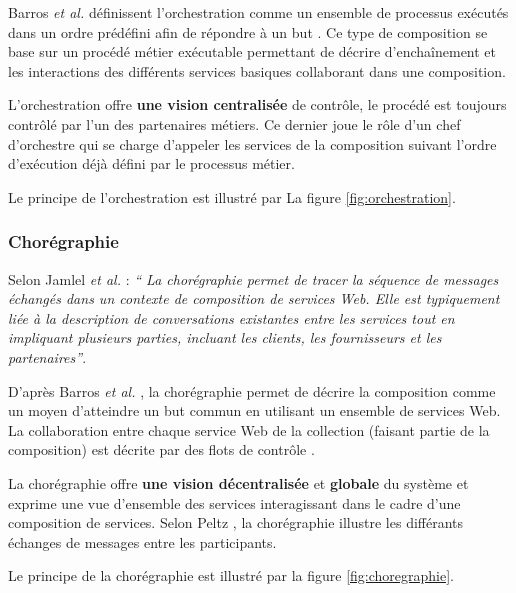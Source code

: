       Barros \emph{et al.} \cite{barros2006standards} définissent
      l'orchestration comme un ensemble de processus exécutés dans un
      ordre prédéfini afin de répondre à un but
      \cite{lopez2008selection}. Ce type de composition se base sur un
      procédé métier exécutable permettant de décrire d'enchaînement
      et les interactions des différents services basiques collaborant
      dans une composition.
      
      L'orchestration offre \textbf{une vision centralisée} de
      contrôle, le procédé est toujours contrôlé par l'un des
      partenaires métiers. Ce dernier joue le rôle d'un chef
      d'orchestre qui se charge d'appeler les services de la
      composition suivant l'ordre d'exécution déjà défini par le
      processus métier.
      
      Le principe de l'orchestration est illustré par La figure
      \ref{fig:orchestration}.    

      \subsubsection{Chorégraphie}
      \label{sec:choregraphie-sec}
      Selon Jamlel \emph{et al.} \cite{jamal2005environnement} :
      \emph{`` La chorégraphie permet de tracer la séquence de
        messages échangés dans un contexte de composition de services
        Web. Elle est typiquement liée à la description de
        conversations existantes entre les services tout en impliquant
        plusieurs parties, incluant les clients, les fournisseurs et
        les partenaires''}.

      D'après Barros \emph{et al.} \cite{barros2006standards}, la
      chorégraphie permet de décrire la composition comme un moyen
      d'atteindre un but commun en utilisant un ensemble de services
      Web. La collaboration entre chaque service Web de la collection
      (faisant partie de la composition) est décrite par des flots de
      contrôle \cite{lopez2008selection}.

      La chorégraphie offre \textbf{une vision décentralisée} et
      \textbf{globale} du système et exprime une vue d'ensemble des
      services interagissant dans le cadre d'une composition de
      services. Selon Peltz \cite{peltz2003web}, la chorégraphie
      illustre les différants échanges de messages entre les
      participants.

      Le principe de la chorégraphie est illustré par la figure
      \ref{fig:choregraphie}.

